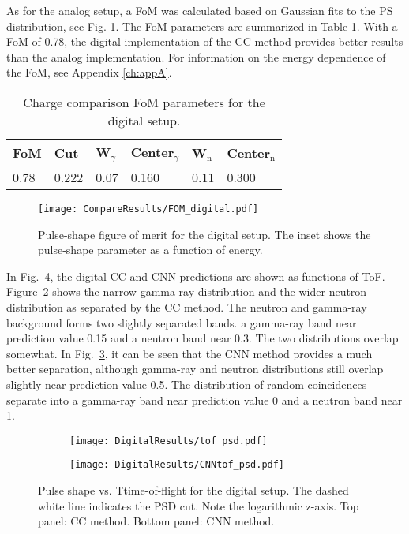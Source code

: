 \documentclass[main.tex]{subfiles}
\begin{document}
As for the analog setup, a FoM was calculated based on Gaussian fits to the PS distribution, see Fig. \ref{fig:fom_d}. The FoM parameters are summarized in Table \ref{tab:fom_d}. With a FoM of 0.78, the digital implementation of the CC method provides better results than the analog implementation. For information on the energy dependence of the FoM, see Appendix \ref{ch:appA}.

\begin{table}[h]
\center
\begin{tabular}{|l|l|l|l|l|l|}
\hline
FoM  & Cut   & W$_\gamma$ & Center$_\gamma$ & W$_\textrm{n}$ & Center$_\textrm{n}$ \\ \hline
0.78 & 0.222 & 0.07          & 0.160           & 0.11              & 0.300               \\ \hline
\end{tabular}
\caption{Charge comparison FoM parameters for the digital setup.}
\label{tab:fom_d}
\end{table}

\begin{figure}[h!]
	    \centering
    	    \texttt{[image: CompareResults/FOM\_digital.pdf]}
	    \caption[Pulse-shape figure of merit for the digital setup.]{Pulse-shape figure of merit for the digital setup. The inset shows the pulse-shape parameter as a function of energy.}
   	    \label{fig:fom_d} 
\end{figure}

In Fig.~\ref{fig:tof_cc_tof_cnn}, the digital CC and CNN predictions are shown as functions of ToF. Figure~\ref{fig:tof_digi_cc} shows the narrow gamma-ray distribution and the wider neutron distribution as separated by the CC method. 
The neutron and gamma-ray background forms two slightly separated bands. a gamma-ray band near prediction value 0.15 and a neutron band near 0.3. The two distributions overlap somewhat.  
In Fig.~\ref{fig:tof_digi_cnn}, it can be seen that the CNN method provides a much better separation, although gamma-ray and neutron distributions still overlap slightly near prediction value 0.5. The distribution of random coincidences separate into a gamma-ray band near prediction value 0 and a neutron band near 1.


\begin{figure}
    \centering
    \begin{subfigure}[ht]{\textwidth}
    	\centering
        \texttt{[image: DigitalResults/tof\_psd.pdf]}
        \caption{}
        \label{fig:tof_digi_cc}
    \end{subfigure}
	\begin{subfigure}[ht]{\textwidth}
		\centering
        \texttt{[image: DigitalResults/CNNtof\_psd.pdf]}
        \caption{}
        \label{fig:tof_digi_cnn}
    \end{subfigure}
    \caption[Pulse shape vs. time-of-flight for the digital setup.]{Pulse shape vs. Ttime-of-flight for the digital setup. The dashed white line indicates the PSD cut. Note the logarithmic z-axis. Top panel: CC method. Bottom panel: CNN method.}
    \label{fig:tof_cc_tof_cnn}
\end{figure}
\end{document}
